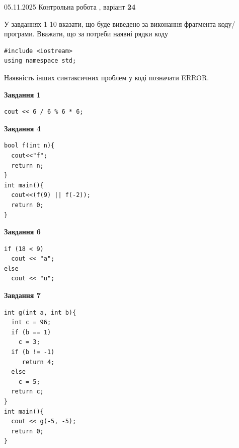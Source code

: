 \documentclass[12pt, ukrainian]{article}
\begin{document}
\newpage

{\Large{05.11.2025 Контрольна робота , варіант  \No \textbf { 24 }\par}}
{
\begin {large}
У завданнях 1-10 вказати, що буде виведено за виконання фрагмента коду/про\-гра\-ми.
Вважати, що за потреби наявні рядки коду
\begin{verbatim}
#include <iostream>
using namespace std;
\end{verbatim}
Наявність інших синтаксичних проблем у коді позначати ERROR.

\begin{minipage}[t]{7.0cm}

\begin{center}
\textbf{Завдання 1}
\end{center}
\vspace{-8mm}

\begin{verbatim}
cout << 6 / 6 % 6 * 6;
\end{verbatim}



\begin{center}
\textbf{Завдання 4}
\end{center}
\vspace{-8mm}

\begin{verbatim}
bool f(int n){
  cout<<"f";
  return n;
}
int main(){
  cout<<(f(9) || f(-2));
  return 0;
}
\end{verbatim}



\begin{center}
\textbf{Завдання 6}
\end{center}
\vspace{-8mm}

\begin{verbatim}
if (18 < 9)
  cout << "a";
else
  cout << "u";
\end{verbatim}



\begin{center}
\textbf{Завдання 7}
\end{center}
\vspace{-8mm}

\begin{verbatim}
int g(int a, int b){
  int c = 96;
  if (b == 1)
    c = 3;
  if (b != -1)
     return 4;
  else
    c = 5;
  return c;
}
int main(){
  cout << g(-5, -5);
  return 0;
}
\end{verbatim}


\end{minipage}
\end{large}}
\end{document}
